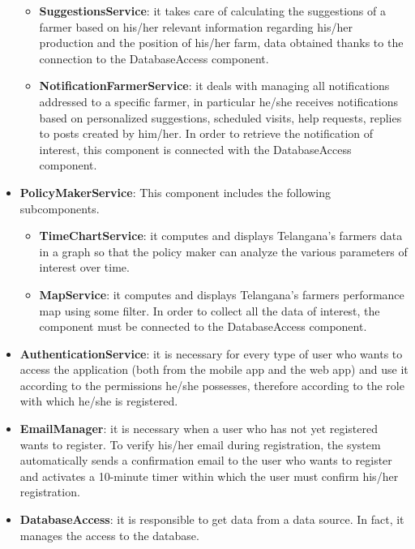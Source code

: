 \begin{itemize}
\begin{itemize}
    \item \textbf{SuggestionsService}: it takes care of calculating the suggestions of a farmer based on his/her relevant information regarding his/her production and the position of his/her farm, data obtained thanks to the connection to the DatabaseAccess component.
    \item \textbf{NotificationFarmerService}: it deals with managing all notifications addressed to a specific farmer, in particular he/she receives notifications based on personalized suggestions, scheduled visits, help requests, replies to posts created by him/her. In order to retrieve the notification of interest, this component is connected with the DatabaseAccess component.
\end{itemize}

\item \textbf{PolicyMakerService}: This component includes the following subcomponents.

\begin{itemize}
    \item \textbf{TimeChartService}: it computes and displays Telangana’s farmers data in a graph so that the policy maker can analyze the various parameters of interest over time.
    \item \textbf{MapService}: it computes and displays Telangana’s farmers performance map using some filter. In order to collect all the data of interest, the component must be connected to the DatabaseAccess component. 
\end{itemize}

\item \textbf{AuthenticationService}: it is necessary for every type of user who wants to access the application (both from the mobile app and the web app) and use it according to the permissions he/she possesses, therefore according to the role with which he/she is registered.

\item \textbf{EmailManager}: it is necessary when a user who has not yet registered wants to register. To verify his/her email during registration, the system automatically sends a confirmation email to the user who wants to register and activates a 10-minute timer within which the user must confirm his/her registration.

\item \textbf{DatabaseAccess}: it is responsible to get data from a data source. In fact, it manages the access to the database.


\end{itemize}
